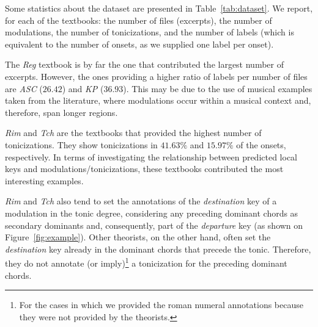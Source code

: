 \label{ssec:stats}

Some statistics about the dataset are presented in
Table~\ref{tab:dataset}. We report, for each of the
textbooks: the number of files (excerpts), the number of
modulations, the number of tonicizations, and the number of
labels (which is equivalent to the number of onsets, as we
supplied one label per onset).


The \emph{Reg} textbook is by far the one that contributed
the largest number of excerpts. However, the ones providing
a higher ratio of labels per number of files are \emph{ASC}
($26.42$) and \emph{KP} ($36.93$). This may be due to the
use of musical examples taken from the literature, where
modulations occur within a musical context and, therefore,
span longer regions.

\emph{Rim} and \emph{Tch} are the textbooks that provided
the highest number of tonicizations. They show tonicizations
in $41.63\%$ and $15.97\%$ of the onsets, respectively. In
terms of investigating the relationship between predicted
local keys and modulations/tonicizations, these textbooks
contributed the most interesting examples.

\emph{Rim} and \emph{Tch} also tend to set the annotations
of the \emph{destination} key of a modulation in the tonic
degree, considering any preceding dominant chords as
secondary dominants and, consequently, part of the
\emph{departure} key (as shown on Figure~\ref{fig:example}).
Other theorists, on the other hand, often set the
\emph{destination} key already in the dominant chords that
precede the tonic. Therefore, they do not annotate (or
imply)\footnote{For the cases in which we provided the roman
numeral annotations because they were not provided by the
theorists.} a tonicization for the preceding dominant
chords.
